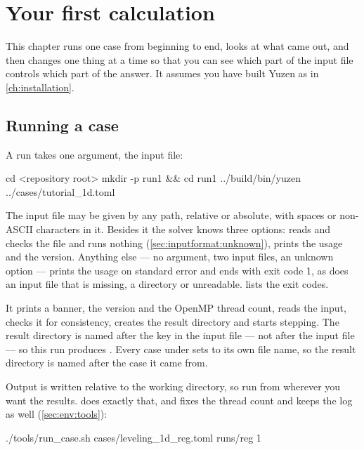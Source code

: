 \chapter{Your first calculation}
\label{ch:firstrun}

This chapter runs one case from beginning to end, looks at what came out, and
then changes one thing at a time so that you can see which part of the input
file controls which part of the answer. It assumes you have built Yuzen as in
\cref{ch:installation}.

\section{Running a case}
\label{sec:firstrun:run}

A run takes one argument, the input file:

\begin{shell}
cd <repository root>
mkdir -p run1 && cd run1
../build/bin/yuzen ../cases/tutorial_1d.toml
\end{shell}

The input file may be given by any path, relative or absolute, with spaces or
non-ASCII characters in it. Besides it the solver knows three options:
 reads and checks the file and runs nothing
(\cref{sec:inputformat:unknown}),  prints the usage and
 the version. Anything else --- no argument, two input files,
an unknown option --- prints the usage on standard error and ends with exit
code 1, as does an input file that is missing, a directory or unreadable.
 lists the exit codes.

It prints a banner, the version and the OpenMP thread count, reads the input,
checks it for consistency, creates the result directory and starts stepping.
The result directory is named after the  key in the input file ---
not after the input file --- so this run produces . Every
case under  sets  to its own file name, so the
result directory is named after the case it came from.

\begin{note}
  Output is written relative to the working directory, so run from wherever you
  want the results.  does exactly that, and fixes the
  thread count and keeps the log as well (\cref{sec:env:tools}):
  \begin{shell}
./tools/run_case.sh cases/leveling_1d_reg.toml runs/reg 1
  \end{shell}
\end{note}

